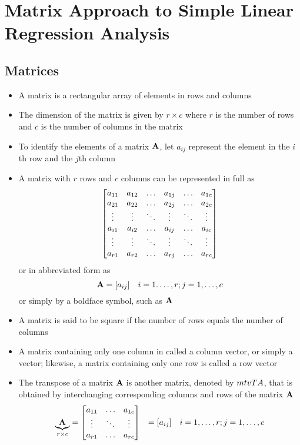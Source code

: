 \section{Matrix Approach to Simple Linear Regression Analysis}
\subsection{Matrices} 
\begin{itemize} 
\item A matrix is a rectangular array of elements in rows and columns 
\item The dimension of the matrix is given by $r \times c$ where $r$ is the number of rows and $c$ is the number of columns in the matrix
\item To identify the elements of a matrix $\mtx{A}$, let $a_{ij}$ represent the element in the $i$th row and the $j$th column 
\item A matrix with $r$ rows and $c$ columns can be represented in full as $$ \matrix{a_{11} & a_{12} & \hdots & a_{1j} & \hdots & a_{1c} \\ a_{21} & a_{22} & \hdots & a_{2j} & \hdots & a_{2c} \\ \vdots & \vdots & \ddots & \vdots & \ddots & \vdots \\ a_{i1} & a_{i2} & \hdots & a_{ij} & \hdots & a_{ic} \\ \vdots & \vdots & \ddots & \vdots & \ddots & \vdots \\ a_{r1} & a_{r2} & \hdots & a_{rj} & \hdots & a_{rc}} $$ or in abbreviated form as $$ \mtx{A} = [a_{ij}] ~~~ i = 1.\dots, r; j = 1,\dots, c $$ or simply by a boldface symbol, such as $\mtx{A}$
\item A matrix is said to be square if the number of rows equals the number of columns
\item A matrix containing only one column in called a column vector, or simply a vector; likewise, a matrix containing only one row is called a row vector
\item The transpose of a matrix $\mtx{A}$ is another matrix, denoted by $\\mtvT{A}$, that is obtained by interchanging corresponding columns and rows of the matrix $\mtx{A}$ 
$$ \begin{aligned} 
\underbrace{\mtx{A}}_{r \times c} &= \matrix{a_{11} & \hdots & a_{1c} \\ \vdots & \ddots & \vdots \\ a_{r1} & \hdots & a_{rc} } &= [a_{ij}] ~~~ &i = 1,\dots,r; j = 1,\dots, c \\ 

\end{aligned}$$
\end{itemize}
